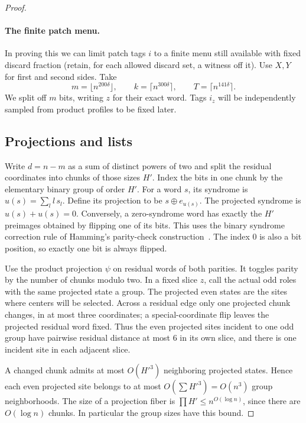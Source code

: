 \begin{proof}\leavevmode\par
\paragraph{The finite patch menu.}
In proving this we can limit patch tags \(i\) to a finite menu still available with fixed discard fraction (retain, for each allowed discard set, a witness off it). Use \(X,Y\) for first and second sides. Take
\[
 m=\lfloor n^{200\delta}\rfloor,\qquad k=\lceil n^{300\delta}\rceil,\qquad T=\lceil n^{141\delta}\rceil .
\]
We split off \(m\) bits, writing \(z\) for their exact word. Tags \(i_z\) will be independently sampled from product profiles to be fixed later.

\subsection{Projections and lists}
\label{sec:projections-and-lists}

Write \(d=n-m\) as a sum of distinct powers of two and split the residual coordinates into chunks of those sizes \(H'\). Index the bits in one chunk by the elementary binary group of order \(H'\). For a word \(s\), its syndrome is
\(u(s)=\sum_l l\,s_l\).
Define its projection to be \(s\oplus e_{u(s)}\). The projected syndrome is \(u(s)+u(s)=0\). Conversely, a zero-syndrome word has exactly the \(H'\) preimages obtained by flipping one of its bits. This uses the binary syndrome correction rule of Hamming's parity-check construction~\cite[Sections~3--4]{hamming1950}. The index 0 is also a bit position, so exactly one bit is always flipped.

Use the product projection \(\psi\) on residual words of both parities. It toggles parity by the number of chunks modulo two. In a fixed slice \(z\), call the actual odd roles with the same projected state a group. The projected even states are the sites where centers will be selected. Across a residual edge only one projected chunk changes, in at most three coordinates; a special-coordinate flip leaves the projected residual word fixed. Thus the even projected sites incident to one odd group have pairwise residual distance at most 6 in its own slice, and there is one incident site in each adjacent slice.

A changed chunk admits at most \(O(H'^3)\) neighboring projected states. Hence each even projected site belongs to at most \(O(\sum H'^3)=O(n^3)\) group neighborhoods. The size of a projection fiber is \(\prod H'\le n^{O(\log n)}\), since there are \(O(\log n)\) chunks. In particular the group sizes have this bound.


\end{proof}
